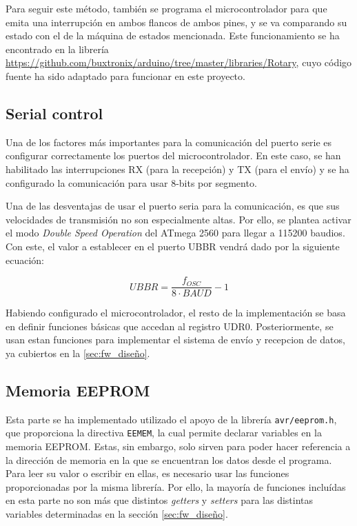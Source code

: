 Para seguir este método, también se programa el microcontrolador para que emita una interrupción en ambos flancos de ambos pines, y se va comparando su estado con el de la máquina de estados mencionada. Este funcionamiento se ha encontrado en la librería \url{https://github.com/buxtronix/arduino/tree/master/libraries/Rotary}, cuyo código fuente ha sido adaptado para funcionar en este proyecto.


\subsection{Serial control}

Una de los factores más importantes para la comunicación del puerto serie es configurar correctamente los puertos del microcontrolador. En este caso, se han habilitado las interrupciones RX (para la recepción) y TX (para el envío) y se ha configurado la comunicación para usar 8-bits por segmento.

Una de las desventajas de usar el puerto seria para la comunicación, es que sus velocidades de transmisión no son especialmente altas. Por ello, se plantea activar el modo \textit{Double Speed Operation} del ATmega 2560 para llegar a 115200 baudios. Con este, el valor a establecer en el puerto UBBR vendrá dado por la siguiente ecuación: \cite{atmega2560}

\begin{center}
    \[UBBR = \frac{f_{OSC}}{8 \cdot BAUD} - 1\]
\end{center}

Habiendo configurado el microcontrolador, el resto de la implementación se basa en definir funciones básicas que accedan al registro UDR0. Posteriormente, se usan estan funciones para implementar el sistema de envío y recepcion de datos, ya cubiertos en la \ref{sec:fw_diseño}.

\subsection{Memoria EEPROM}

Esta parte se ha implementado utilizado el apoyo de la librería \verb|avr/eeprom.h|, que proporciona la directiva \verb|EEMEM|, la cual permite declarar variables en la memoria EEPROM. Estas, sin embargo, solo sirven para poder hacer referencia a la dirección de memoria en la que se encuentran los datos desde el programa. Para leer su valor o escribir en ellas, es necesario usar las funciones proporcionadas por la misma librería. Por ello, la mayoría de funciones incluídas en esta parte no son más que distintos \textit{getters} y \textit{setters} para las distintas variables determinadas en la sección \ref{sec:fw_diseño}.

